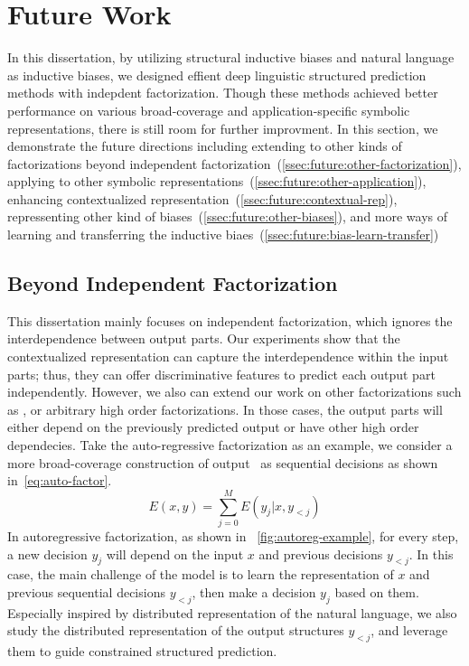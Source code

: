 \section{Future Work}
\label{sec:conclusions:future}
In this dissertation, by utilizing structural inductive biases and natural language as inductive biases, we designed effient deep linguistic structured prediction methods with indepdent factorization. Though these methods achieved better performance on various broad-coverage and application-specific symbolic representations, there is still room for further improvment. In this section, we demonstrate the future directions including extending to other kinds of factorizations beyond independent factorization~(\autoref{ssec:future:other-factorization}), applying to other symbolic representations~(\autoref{ssec:future:other-application}), enhancing contextualized representation~(\autoref{ssec:future:contextual-rep}), repressenting other kind of biases~(\autoref{ssec:future:other-biases}), and more ways of learning and transferring the inductive biaes~(\autoref{ssec:future:bias-learn-transfer})

\subsection{Beyond Independent Factorization}
\label{ssec:future:other-factorization}

This dissertation mainly focuses on independent factorization, which ignores
the interdependence between output parts. Our experiments show that
the contextualized representation can capture the interdependence
within the input parts; thus, they can offer discriminative features
to predict each output part independently. However, we also can extend
our work on other factorizations such as , or arbitrary high order factorizations. In those
cases, the output parts will either depend on the previously predicted
output or have other high order dependecies. Take the auto-regressive
factorization as an example, we consider a more broad-coverage
construction of output \OUT~as sequential decisions as shown
in~\autoref{eq:auto-factor}.
\begin{equation}
  \label{eq:auto-factor}
E(x, y)=\sum_{j=0}^{M}E(y_{j}|x,y_{<j})
\end{equation}
In autoregressive factorization, as shown in
~\autoref{fig:autoreg-example}, for every step, a new decision $y_{j}$
will depend on the input $x$ and previous decisions $y_{<j}$. In this
case, the main challenge of the model is to learn the representation
of $x$ and previous sequential decisions $y_{<j}$, then make a
decision $y_{j}$ based on them.  Especially inspired by distributed
representation of the natural language, we also study the distributed
representation of the output structures $y_{<j}$, and leverage them to
guide constrained structured prediction.

